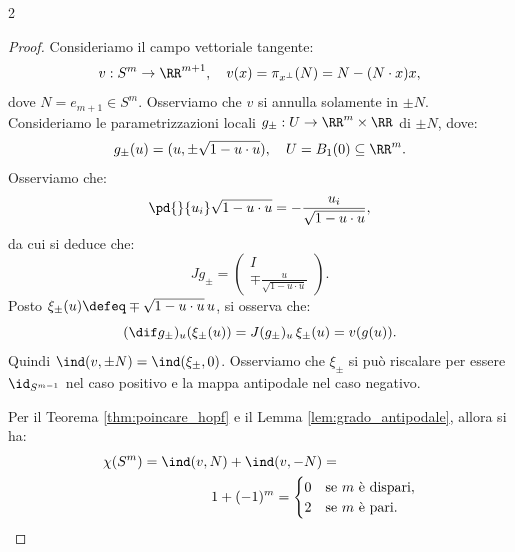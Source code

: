 \begin{multicols*}{2}
    \begin{proof}
        Consideriamo il campo vettoriale tangente:
        \[
            v : S^m \to \RR^{m+1}, \quad v(x) = \pi_{x^\perp}(N) = N - (N \cdot x) x,
        \]
        dove $N = e_{m+1} \in S^m$. Osserviamo che $v$ si annulla solamente in $\pm N$.
        Consideriamo le parametrizzazioni locali $g_\pm : U \to \RR^m \times \RR$ di $\pm N$, dove:
        \[
            g_\pm(u) = (u, \pm \sqrt{1 - u \cdot u}), \quad U = B_1(0) \subseteq \RR^m.
        \]
        Osserviamo che:
        \[
            \pd{}{u_i} \sqrt{1 - u \cdot u} = - \frac{u_i}{\sqrt{1 - u \cdot u}},
        \]
        da cui si deduce che:
        \[
            J g_\pm = \begin{pmatrix}
                I \\
                \mp \frac{u}{\sqrt{1 - u \cdot u}}
            \end{pmatrix}.
        \]
        Posto $\xi_\pm(u) \defeq \mp \sqrt{1 - u \cdot u} \, u$, si osserva che:
        \[
            (\dif g_\pm)_u(\xi_\pm(u)) = J (g_\pm)_u \, \xi_\pm(u) = v(g(u)).
        \]
        Quindi $\ind(v, \pm N) = \ind(\xi_\pm, 0)$. Osserviamo che $\xi_\pm$ si può
        riscalare per essere $\id_{S^{m-1}}$ nel caso positivo e la mappa
        antipodale nel caso negativo. \smallskip

        Per il Teorema \ref{thm:poincare_hopf} e il Lemma \ref{lem:grado_antipodale}, allora si ha:
        \[
            \begin{split}
                \chi(S^m) = \ind(v, N) + \ind(v, -N) = \hspace{2cm} \\
                \hspace{2cm} 1 + (-1)^m = \begin{cases}
                                              0 & \text{se $m$ è dispari}, \\
                                              2 & \text{se $m$ è pari}.
                                          \end{cases}
            \end{split}
        \]
    \end{proof}
\end{multicols*}
